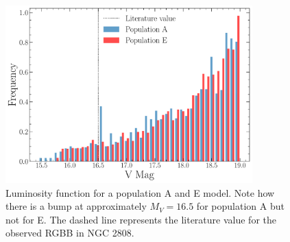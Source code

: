 \begin{figure}
  \centering
  \includegraphics[width=0.85\textwidth]{figures/rgbb/ComparisonOfRGBBump.pdf}
  \caption{Luminosity function for a population A and E model. Note how there
  is a bump at approximately $M_{V} = 16.5$ for population A but not for E. The
  dashed line represents the literature value for the observed RGBB in NGC
  2808.}
  \label{fig:LumFAE}
\end{figure}


